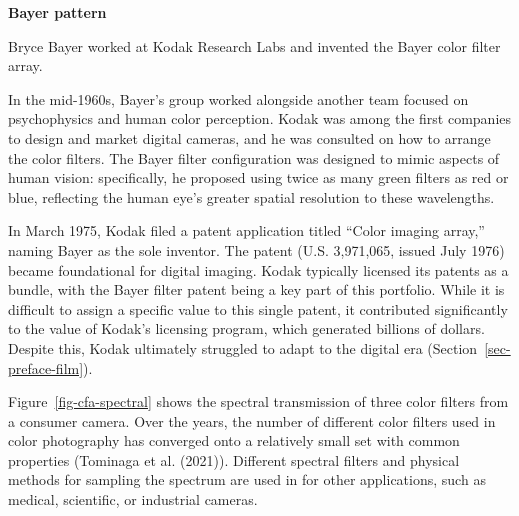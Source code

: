 \documentclass[
  letterpaper,
]{book}
\begin{document}
\begin{tcolorbox}[enhanced jigsaw, opacityback=0, breakable, leftrule=.75mm, left=2mm, colframe=quarto-callout-note-color-frame, toprule=.15mm, colback=white, rightrule=.15mm, bottomrule=.15mm, arc=.35mm]
\begin{minipage}[t]{5.5mm}
\textcolor{quarto-callout-note-color}{\faInfo}
\end{minipage}%
\begin{minipage}[t]{\textwidth - 5.5mm}

\vspace{-3mm}\textbf{Bayer pattern}\vspace{3mm}

Bryce Bayer worked at Kodak Research Labs and invented the Bayer color
filter array.

In the mid-1960s, Bayer's group worked alongside another team focused on
psychophysics and human color perception. Kodak was among the first
companies to design and market digital cameras, and he was consulted on
how to arrange the color filters. The Bayer filter configuration was
designed to mimic aspects of human vision: specifically, he proposed
using twice as many green filters as red or blue, reflecting the human
eye's greater spatial resolution to these wavelengths.

In March 1975, Kodak filed a patent application titled ``Color imaging
array,'' naming Bayer as the sole inventor. The patent (U.S. 3,971,065,
issued July 1976) became foundational for digital imaging. Kodak
typically licensed its patents as a bundle, with the Bayer filter patent
being a key part of this portfolio. While it is difficult to assign a
specific value to this single patent, it contributed significantly to
the value of Kodak's licensing program, which generated billions of
dollars. Despite this, Kodak ultimately struggled to adapt to the
digital era (Section~\ref{sec-preface-film}).

\end{minipage}%
\end{tcolorbox}

Figure~\ref{fig-cfa-spectral} shows the spectral transmission of three
color filters from a consumer camera. Over the years, the number of
different color filters used in color photography has converged onto a
relatively small set with common properties (Tominaga et al. (2021)).
Different spectral filters and physical methods for sampling the
spectrum are used in for other applications, such as medical,
scientific, or industrial cameras.
\end{document}
